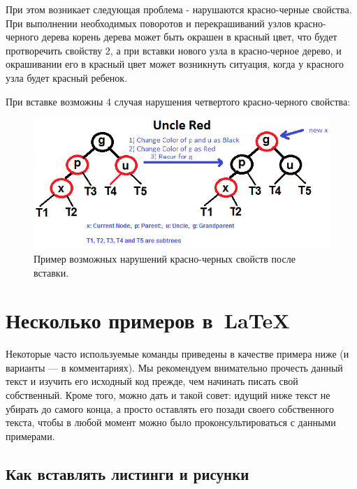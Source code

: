 При этом возникает следующая проблема - нарушаются красно-черные свойства.
При выполнении необходимых поворотов и перекрашиваний узлов красно-черного 
дерева корень дерева может быть окрашен в красный цвет, что будет протворечить
свойству 2, а при вставки нового узла в красно-черное дерево, и окрашивании
его в красный цвет может возникнуть ситуация, когда у красного узла будет 
красный ребенок.

При вставке возможны 4 случая нарушения четвертого красно-черного свойства:
\begin{figure}[H]
\centering
\includegraphics[width=\textwidth]{img/tan-aus.png}
\caption{Пример возможных нарушений красно-черных свойств после вставки.}
\end{figure}  



\section{Несколько примеров в~\LaTeX{}}
\label{sec:examples}

Некоторые часто используемые
команды приведены в качестве примера ниже (и варианты — в
комментариях). Мы рекомендуем внимательно прочесть данный
текст и изучить его исходный код прежде, чем начинать писать
свой собственный. Кроме того, можно дать и такой совет: идущий
ниже текст не убирать до самого конца, а просто оставлять его
позади своего собственного текста, чтобы в любой момент можно
было проконсультироваться с данными примерами.

\subsection{Как вставлять листинги и рисунки}

